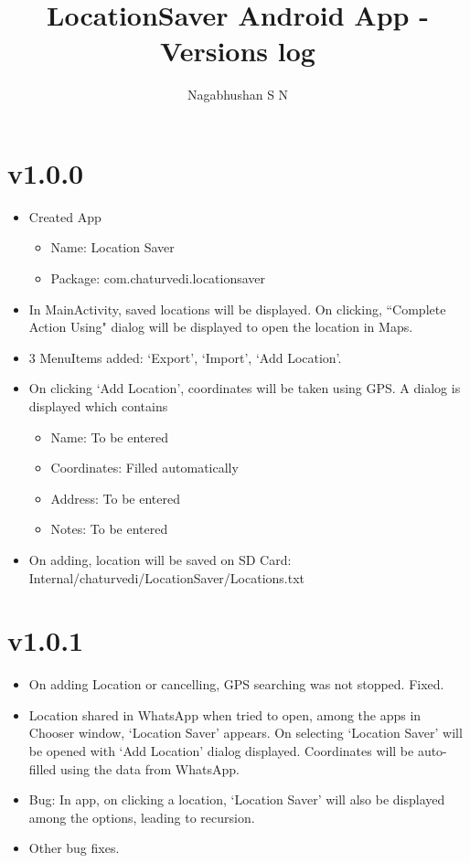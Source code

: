 \documentclass{article}
\title{LocationSaver Android App - Versions log}
\author{Nagabhushan S N}
\begin{document}
\maketitle
\tableofcontents
\newpage

\section{v1.0.0}
\begin{itemize}
\item Created App
  \begin{itemize}
  \item Name: Location Saver
  \item Package: com.chaturvedi.locationsaver
  \end{itemize}
\item In MainActivity, saved locations will be displayed. On clicking, ``Complete Action Using" dialog will be displayed to open the location in Maps.
\item 3 MenuItems added: `Export', `Import', `Add Location'.
\item On clicking `Add Location', coordinates will be taken using GPS. A dialog is displayed which contains 
  \begin{itemize}
  \item Name: To be entered
  \item Coordinates: Filled automatically
  \item Address: To be entered
  \item Notes: To be entered
  \end{itemize}
\item On adding, location will be saved on SD Card: Internal/chaturvedi/LocationSaver/Locations.txt
\end{itemize}

\section{v1.0.1}
\begin{itemize}
\item On adding Location or cancelling, GPS searching was not stopped. Fixed.
\item Location shared in WhatsApp when tried to open, among the apps in Chooser window, `Location Saver' appears. On selecting `Location Saver' will be opened with `Add Location' dialog displayed. Coordinates will be auto-filled using the data from WhatsApp.
\item Bug: In app, on clicking a location, `Location Saver' will also be displayed among the options, leading to recursion.
\item Other bug fixes.
\end{itemize}
\end{document}
